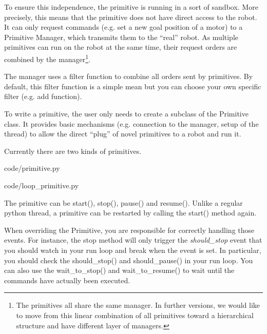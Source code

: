 To ensure this independence, the primitive is running in a sort of sandbox. More precisely, this means that the primitive does not have direct access to the robot. It can only request commands (e.g. set a new goal position of a motor) to a Primitive Manager, which transmits them to the “real” robot. As multiple primitives can run on the robot at the same time, their request orders are combined by the manager\footnote{The primitives all share the same manager. In further versions, we would like to move from this linear combination of all primitives toward a hierarchical structure and have different layer of managers.}.

The manager uses a filter function to combine all orders sent by primitives. By default, this filter function is a simple mean but you can choose your own specific filter (e.g. add function).

To write a primitive, the user only needs to create a subclass of the Primitive class. It provides basic mechanisms (e.g. connection to the manager, setup of the thread) to allow the direct “plug” of novel primitives to a robot and run it.

Currently there are two kinds of primitives.



    {code/primitive.py}


    {code/loop_primitive.py}

The primitive can be start(), stop(), pause() and resume(). Unlike a regular python thread, a primitive can be restarted by calling the start() method again.

When overriding the Primitive, you are responsible for correctly handling those events. For instance, the stop method will only trigger the \emph{should\_stop} event that you should watch in your run loop and break when the event is set. In particular, you should check the should\_stop() and should\_pause() in your run loop. You can also use the wait\_to\_stop() and wait\_to\_resume() to wait until the commands have actually been executed.


